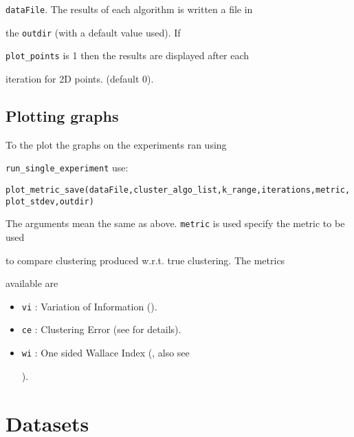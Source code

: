 \documentclass[10pt]{article}
\begin{document}
\texttt{dataFile}. The results of each algorithm is written a file in

the \texttt{outdir} (with a default value used). If

\texttt{plot\_points} is 1 then the results are displayed after each

iteration for 2D points. (default 0). 





\subsection{Plotting graphs}

\label{sec:plot}



To the plot the graphs on the experiments ran using

\texttt{run\_single\_experiment} use:



\texttt{plot\_metric\_save(dataFile,cluster\_algo\_list,k\_range,iterations,metric,plot\_stdev,outdir)}



The arguments mean the same as above. \texttt{metric} is used  specify the metric to be used

to compare clustering produced w.r.t. true clustering. The metrics

available are 

\begin{itemize}

\item \texttt{vi} : Variation of Information (\cite{stat418}). 

\item \texttt{ce} : Clustering Error (see \cite{VM03} for details). 

  

\item \texttt{wi} : One sided Wallace Index (\cite{wallas}, also see

  \cite{VM03}). 

  

\end{itemize}







\section{Datasets}
\end{document}
